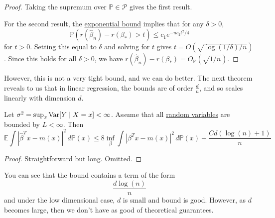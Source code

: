 \begin{proof}
    Taking the supremum over $\mathbb{P} \in \mathcal{P}$ gives the first result.

    For the second result, the \hyperref[thm:exponential-bound]{exponential bound} implies that for any $\delta > 0$,
    \begin{equation}
     \mathbb{P}(r(\hat{\beta}_n) - r(\beta_\ast) > t) \leq c_1 e^{-n c_2 t^2/4}
    \end{equation}
    for $t > 0$. Setting this equal to $\delta$ and solving for $t$ gives $t = O(\sqrt{\log(1/\delta)/n})$. Since this holds for all $\delta > 0$, we have $r(\hat{\beta}_n) - r(\beta_\ast) = O_{\mathbb{P}}(\sqrt{1/n})$.
  \end{proof}

  However, this is not a very tight bound, and we can do better. The next theorem reveals to us that in linear regression, the bounds are of order $\frac{d}{n}$, and so scales linearly with dimension $d$. 

  \begin{theorem}
    \label{thm:gyorfi-kohler-krzyzak-walk-2002-cite}
 
    Let $\sigma^2 = \sup_x \operatorname{Var} [Y \mid X = x] < \infty$. Assume that all \hyperref[prob-def:random-variable]{random variables} are bounded by $L < \infty$. Then 
    \begin{equation}
      \mathbb{E} \int |\hat{\beta}^T x - m(x) |^2 \, d\mathbb{P}(x) \leq 8 \inf_{\beta} \int |\beta^T x - m(x) |^2 \,d \mathbb{P}(x) + \frac{C d (\log(n) + 1)}{n}
    \end{equation}
  \end{theorem}
  \begin{proof}
    Straightforward but long. Omitted. 
  \end{proof}

  You can see that the bound contains a term of the form 
  \begin{equation}
    \frac{d \log(n)}{n}
  \end{equation}
  and under the low dimensional case, $d$ is small and bound is good. However, as $d$ becomes large, then we don't have as good of theoretical guarantees. 

